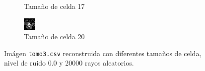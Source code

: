 \documentclass{beamer}
\begin{document}
\begin{frame}
\begin{figure}
\begin{subfigure}{0.4\linewidth}
  \caption{Tamaño de celda 17}
\end{subfigure}%
\begin{subfigure}{0.4\linewidth}
  \centering
  \includegraphics[width=0.6\linewidth]{celdas/tomo3-20-0}
  \caption{Tamaño de celda 20}
\end{subfigure}%

\caption{Imágen \texttt{tomo3.csv} reconstruida con diferentes tamaños de celda, nivel de ruido 0.0 y 20000 rayos aleatorios.}
\label{fig:muestras_celdas}
\end{figure}

\end{frame}
\end{document}
